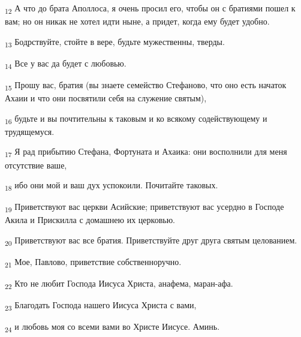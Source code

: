 \begin{tcolorbox}
\textsubscript{12} А что до брата Аполлоса, я очень просил его, чтобы он с братиями пошел к вам; но он никак не хотел идти ныне, а придет, когда ему будет удобно.
\end{tcolorbox}
\begin{tcolorbox}
\textsubscript{13} Бодрствуйте, стойте в вере, будьте мужественны, тверды.
\end{tcolorbox}
\begin{tcolorbox}
\textsubscript{14} Все у вас да будет с любовью.
\end{tcolorbox}
\begin{tcolorbox}
\textsubscript{15} Прошу вас, братия (вы знаете семейство Стефаново, что оно есть начаток Ахаии и что они посвятили себя на служение святым),
\end{tcolorbox}
\begin{tcolorbox}
\textsubscript{16} будьте и вы почтительны к таковым и ко всякому содействующему и трудящемуся.
\end{tcolorbox}
\begin{tcolorbox}
\textsubscript{17} Я рад прибытию Стефана, Фортуната и Ахаика: они восполнили для меня отсутствие ваше,
\end{tcolorbox}
\begin{tcolorbox}
\textsubscript{18} ибо они мой и ваш дух успокоили. Почитайте таковых.
\end{tcolorbox}
\begin{tcolorbox}
\textsubscript{19} Приветствуют вас церкви Асийские; приветствуют вас усердно в Господе Акила и Прискилла с домашнею их церковью.
\end{tcolorbox}
\begin{tcolorbox}
\textsubscript{20} Приветствуют вас все братия. Приветствуйте друг друга святым целованием.
\end{tcolorbox}
\begin{tcolorbox}
\textsubscript{21} Мое, Павлово, приветствие собственноручно.
\end{tcolorbox}
\begin{tcolorbox}
\textsubscript{22} Кто не любит Господа Иисуса Христа, анафема, маран-афа.
\end{tcolorbox}
\begin{tcolorbox}
\textsubscript{23} Благодать Господа нашего Иисуса Христа с вами,
\end{tcolorbox}
\begin{tcolorbox}
\textsubscript{24} и любовь моя со всеми вами во Христе Иисусе. Аминь.
\end{tcolorbox}
